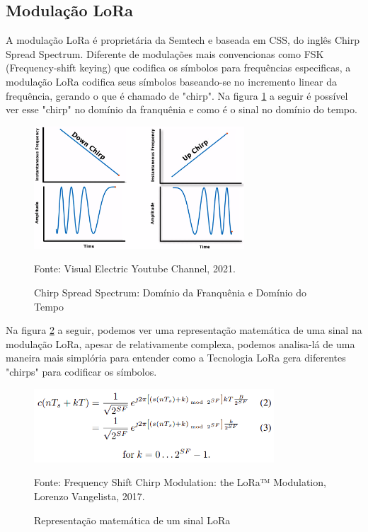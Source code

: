 \newpage

\subsection{Modulação LoRa}

A modulação LoRa é proprietária da Semtech e baseada em CSS, do inglês Chirp Spread Spectrum.
Diferente de modulações mais convencionas como FSK (Frequency-shift keying) que codifica
os símbolos para frequências especificas, a modulação LoRa codifica seus símbolos baseando-se no
incremento linear da frequência, gerando o que é chamado de "chirp". Na figura \ref{fig:lora1}
a seguir é possível ver esse "chirp" no domínio da franquênia e como é o sinal no domínio do
tempo. \cite{8067462}

\begin{figure}[H]
    \centering
	\caption{Chirp Spread Spectrum: Domínio da Franquênia e Domínio do Tempo}
    \includegraphics[width=0.7\textwidth]{img/lora1.png}
    \label{fig:lora1}
    
    Fonte: Visual Electric Youtube Channel, 2021.
\end{figure}

Na figura \ref{fig:lora2} a seguir, podemos ver uma representação matemática de uma sinal na modulação LoRa,
apesar de relativamente complexa, podemos analisa-lá de uma maneira mais simplória para entender como
a Tecnologia LoRa gera diferentes "chirps" para codificar os símbolos.

\begin{figure}[H]
    \centering
	\caption{Representação matemática de um sinal LoRa}
    \includegraphics[width=0.8\textwidth]{img/lora2.png}
    \label{fig:lora2}
    
    Fonte: Frequency Shift Chirp Modulation: the LoRa™ Modulation, Lorenzo Vangelista, 2017.
\end{figure}


